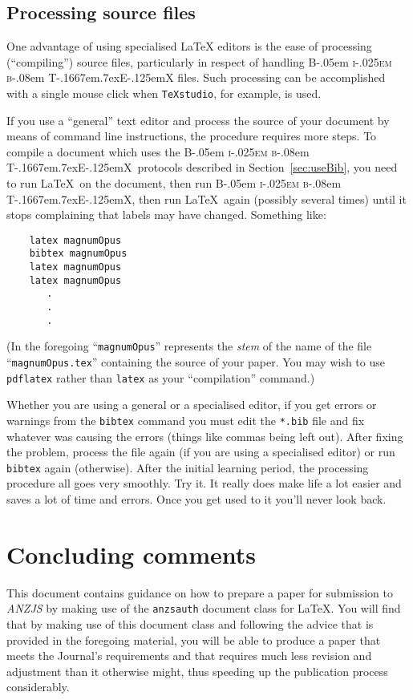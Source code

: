 \documentclass[times, doublespace]{anzsauth}
\newcommand\BibTeX{{\rmfamily B\kern-.05em \textsc{i\kern-.025em b}\kern-.08em
T\kern-.1667em\lower.7ex\hbox{E}\kern-.125emX}}
\begin{document}
\subsection{Processing source files}
\label{sec:procBib}

One advantage of using specialised \LaTeX{} editors is the ease of
processing (``compiling'') source files, particularly in respect of
handling \BibTeX{} files. Such processing can be accomplished with
a single mouse click when \texttt{TeXstudio}, for example, is used.

If you use a ``general'' text editor and process the source
of your document by means of command line instructions, the procedure
requires more steps.  To compile a document which uses the \BibTeX\
protocols described in Section~\ref{sec:useBib}, you need to run
\LaTeX\ on the document, then run \BibTeX, then run \LaTeX\ again
(possibly several times) until it stops complaining that labels
may have changed.  Something like:
\begin{verbatim}
    latex magnumOpus
    bibtex magnumOpus
    latex magnumOpus
    latex magnumOpus
       .
       .
       .
\end{verbatim}
(In the foregoing ``\texttt{magnumOpus}'' represents the \emph{stem}
of the name of the file ``\texttt{magnumOpus.tex}'' containing
the source of your paper.  You may wish to use \texttt{pdflatex}
rather than \texttt{latex} as your ``compilation'' command.)

Whether you are using a general or a specialised editor, if you get
errors or warnings from the \texttt{bibtex} command you must edit
the \texttt{*.bib} file and fix whatever was causing the errors
(things like commas being left out).  After fixing the problem,
process the file again (if you are using a specialised editor)
or run \texttt{bibtex} again (otherwise).  After the initial
learning period, the processing procedure all goes very smoothly.
Try it. It really does make life a lot easier and saves a lot of
time and errors. Once you get used to it you'll never look back.

\section{Concluding comments}
\label{sec:concComm}

This document contains guidance on how to prepare a paper for
submission to \textit{ANZJS} by making use of the \texttt{anzsauth}
document class for \LaTeX.  You will find that by making use of this
document class and following the advice that is provided in the
foregoing material, you will be able to produce a paper that meets
the Journal's requirements and that requires much less revision and
adjustment than it otherwise might, thus speeding up the publication
process considerably.
\end{document}
